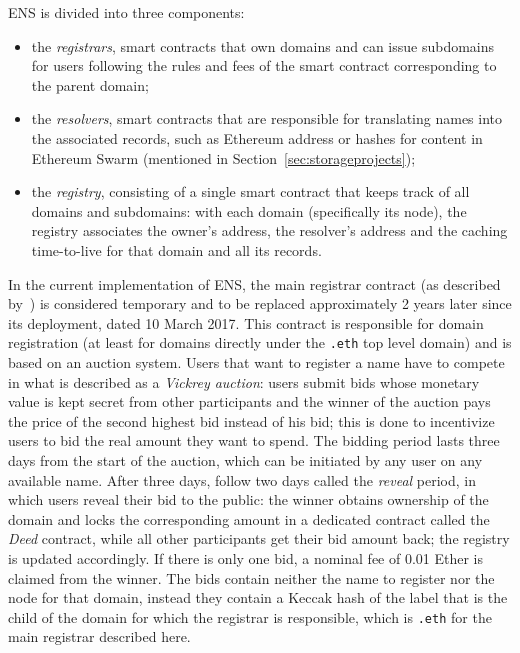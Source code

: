 \documentclass[mscthesis]{usiinfthesis}
\begin{document}
ENS is divided into three components:
\begin{itemize}
	\item the \emph{registrars}, smart contracts that own domains and can issue subdomains for users following the rules and fees of the smart contract corresponding to the parent domain; 
	\item the \emph{resolvers}, smart contracts that are responsible for translating names into the associated records, such as Ethereum address or hashes for content in Ethereum Swarm (mentioned in Section~\ref{sec:storageprojects});
	\item the \emph{registry}, consisting of a single smart contract that keeps track of all domains and subdomains: with each domain (specifically its node), the registry associates the owner's address, the resolver's address and the caching time-to-live for that domain and all its records.
\end{itemize}

In the current implementation of ENS, the main registrar contract (as described by~\cite{eip:ensregistrar}) is considered temporary and to be replaced approximately 2 years later since its deployment, dated 10 March 2017. This contract is responsible for domain registration (at least for domains directly under the \texttt{.eth} top level domain) and is based on an auction system. Users that want to register a name have to compete in what is described as a \emph{Vickrey auction}: users submit bids whose monetary value is kept secret from other participants and the winner of the auction pays the price of the second highest bid instead of his bid; this is done to incentivize users to bid the real amount they want to spend. The bidding period lasts three days from the start of the auction, which can be initiated by any user on any available name. After three days, follow two days called the \emph{reveal} period, in which users reveal their bid to the public: the winner obtains ownership of the domain and locks the corresponding amount in a dedicated contract called the \emph{Deed} contract, while all other participants get their bid amount back; the registry is updated accordingly. If there is only one bid, a nominal fee of 0.01 Ether is claimed from the winner. The bids contain neither the name to register nor the node for that domain, instead they contain a Keccak hash of the label that is the child of the domain for which the registrar is responsible, which is \texttt{.eth} for the main registrar described here.
\end{document}
